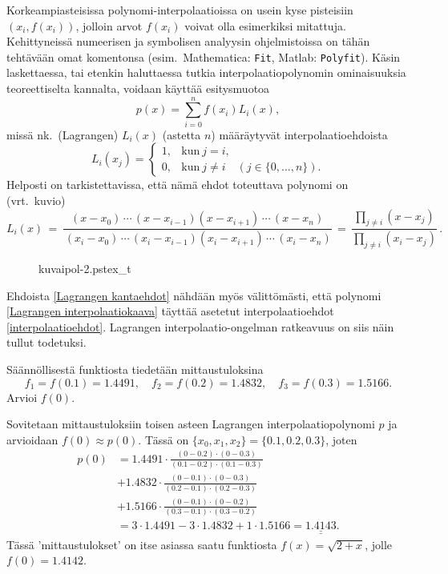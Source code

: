 %
Korkeampiasteisissa polynomi-interpolaatioissa on usein kyse  
pisteisiin $(x_i,f(x_i))$, jolloin arvot $f(x_i)$ voivat olla esimerkiksi mitattuja. 
Kehittyneissä numeerisen ja symbolisen analyysin ohjelmistoissa on tähän tehtävään omat 
komentonsa (esim.\ Mathematica: \verb|Fit|, Matlab: \verb|Polyfit|). Käsin laskettaessa, tai
etenkin haluttaessa tutkia interpolaatiopolynomin ominaisuuksia teoreettiselta kannalta,
voidaan käyttää esitysmuotoa
\begin{equation} \label{Lagrangen interpolaatiokaava}
p(x)=\sum_{i=0}^n f(x_i)L_i(x),
\end{equation}
%
missä nk.\ (Lagrangen)  $L_i(x)$ (astetta $n$) määräytyvät 
interpolaatioehdoista
\begin{equation} \label{Lagrangen kantaehdot}
L_i(x_j)=\begin{cases} 
         1, &\text{kun}\  j=i, \\ 0, &\text{kun}\ j\neq i \quad (j \in \{0, \ldots, n\}). 
         \end{cases}
\end{equation}
Helposti on tarkistettavissa, että nämä ehdot toteuttava polynomi on (vrt.\ kuvio)
\[
L_i(x) \,=\, \frac{(x-x_0)\,\cdots\,(x-x_{i-1})(x-x_{i+1})\,\cdots\,(x-x_n)}
               {\,(x_i-x_0)\,\cdots\,(x_i-x_{i-1})(x_i-x_{i+1})\,\cdots\,(x_i-x_n)}
       \,=\, \frac{\prod_{j \neq i} (x-x_j)}{\prod_{j \neq i} (x_i-x_j)}\,.
\]
\begin{figure}[H]
\begin{center}
{kuvaipol-2.pstex_t}
\end{center}
\end{figure}
Ehdoista \eqref{Lagrangen kantaehdot} nähdään myös välittömästi, että polynomi 
\eqref{Lagrangen interpolaatiokaava} täyttää asetetut interpolaatioehdot 
\eqref{interpolaatioehdot}. Lagrangen interpolaatio-ongelman ratkeavuus on siis näin tullut 
todetuksi.
\begin{Exa} \label{interpolaatioesimerkki}
Säännöllisestä funktiosta tiedetään mittaustuloksina
\[
f_1=f(0.1)=1.4491,\quad f_2=f(0.2)=1.4832,\quad f_3=f(0.3)=1.5166.
\]
Arvioi $f(0)$.
\end{Exa}
\ratk Sovitetaan mittaustuloksiin toisen asteen Lagrangen interpolaatiopolynomi $p$ ja
arvioidaan $f(0)\approx p(0)$. Tässä on $\{x_0,x_1,x_2\}=\{0.1,0.2,0.3\}$, joten
\begin{align*}
p(0) &= 1.4491\cdot\frac{(0-0.2)\cdot (0-0.3)}{(0.1-0.2)\cdot (0.1-0.3)} \\
&+ 1.4832\cdot\frac{(0-0.1)\cdot (0-0.3)}{(0.2-0.1)\cdot (0.2-0.3)} \\
&+ 1.5166\cdot\frac{(0-0.1)\cdot (0-0.2)}{(0.3-0.1)\cdot (0.3-0.2)} \\
&= 3\cdot 1.4491-3\cdot 1.4832+1\cdot 1.5166=\underline{\underline{1.4143}}.
\end{align*}
Tässä 'mittaustulokset' on itse asiassa saatu funktiosta $f(x)=\sqrt{2+x}$, jolle $f(0)=1.4142$.
\loppu

